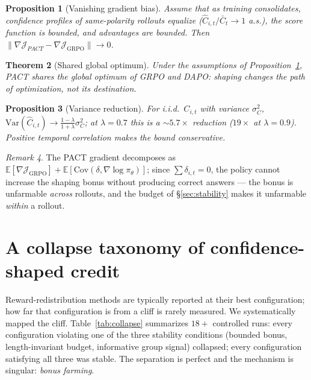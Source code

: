 \documentclass{article} %
\theoremstyle{plain}
\newtheorem{theorem}{Theorem}[section]
\newtheorem{proposition}[theorem]{Proposition}
\theoremstyle{definition}
\theoremstyle{remark}
\newtheorem{remark}[theorem]{Remark}
\newcommand{\method}{PACT}
\begin{document}
\begin{proposition}[Vanishing gradient bias]
\label{prop:consistency}
Assume that as training consolidates, confidence profiles of same-polarity rollouts equalize ($\hat C_{i,t}/\bar C_t \to 1$ a.s.), the score function is bounded, and advantages are bounded. Then $\|\nabla\mathcal{J}_{\method{}} - \nabla\mathcal{J}_{\mathrm{GRPO}}\| \to 0$.
\end{proposition}

\begin{theorem}[Shared global optimum]
\label{thm:optimum}
Under the assumptions of Proposition~\ref{prop:consistency}, \method{} shares the global optimum of GRPO and DAPO: shaping changes the \emph{path} of optimization, not its destination.
\end{theorem}

\begin{proposition}[Variance reduction]
\label{prop:var}
For i.i.d.\ $C_{i,t}$ with variance $\sigma_C^2$, $\mathrm{Var}(\hat C_{i,t}) \to \tfrac{1-\lambda}{1+\lambda}\sigma_C^2$; at $\lambda=0.7$ this is a ${\sim}5.7\times$ reduction ($19\times$ at $\lambda=0.9$). Positive temporal correlation makes the bound conservative.
\end{proposition}

\begin{remark}
The \method{} gradient decomposes as $\mathbb{E}[\nabla\mathcal{J}_{\mathrm{GRPO}}] + \mathbb{E}[\mathrm{Cov}(\delta, \nabla\log\pi_\theta)]$; since $\sum\delta_{i,t}=0$, the policy cannot increase the shaping bonus without producing correct answers --- the bonus is unfarmable \emph{across} rollouts, and the budget of \S\ref{sec:stability} makes it unfarmable \emph{within} a rollout.
\end{remark}

\section{A collapse taxonomy of confidence-shaped credit}
\label{sec:collapse}

Reward-redistribution methods are typically reported at their best configuration; how far that configuration is from a cliff is rarely measured. We systematically mapped the cliff. Table~\ref{tab:collapse} summarizes $18{+}$ controlled runs: every configuration violating one of the three stability conditions (bounded bonus, length-invariant budget, informative group signal) collapsed; every configuration satisfying all three was stable. The separation is perfect and the mechanism is singular: \emph{bonus farming}.
\end{document}
